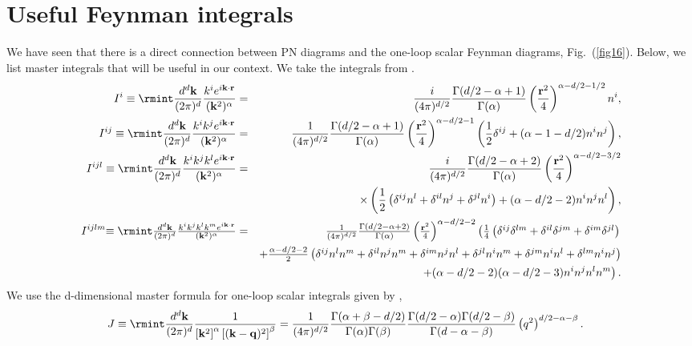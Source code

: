 \section{Useful Feynman integrals} \label{ch1:app:E}
We have seen that there is a direct connection between PN diagrams and the one-loop scalar Feynman diagrams, Fig.~(\ref{fig16}). Below, we list master integrals that will be useful in our context. We take the integrals from \cite{Levi:2011eq}.
\begingroup
\small
\begin{eqnarray}
\label{ch1:tensorfourierindentity}
I^i\equiv\rmint\frac{d^d\bf{k}}{(2\pi)^d}\frac{k^ie^{i\bf{k}\cdot\bf{r}}}{({\bf{k}}^2)^\alpha}&=&\frac{i}{(4\pi)^{d/2}}\frac{\Gamma(d/2-\alpha+1)}{\Gamma(\alpha)}\left(\frac{{\bf{r}}^2}{4}\right)^{\alpha-d/2-1/2}n^i,\\
I^{ij}\equiv\rmint\frac{d^d\bf{k}}{(2\pi)^d}\frac{k^ik^je^{i\bf{k}\cdot\bf{r}}}{({\bf{k}}^2)^\alpha}&=&\frac{1}{(4\pi)^{d/2}}\frac{\Gamma(d/2-\alpha+1)}{\Gamma(\alpha)}\left(\frac{{\bf{r}}^2}{4}\right)^{\alpha-d/2-1}\left(\frac{1}{2}\delta^{ij}+(\alpha-1-d/2)n^in^j\right),\\
I^{ijl}\equiv\rmint\frac{d^d\bf{k}}{(2\pi)^d}\frac{k^ik^jk^le^{i\bf{k}\cdot\bf{r}}}{({\bf{k}}^2)^\alpha}&=&\frac{i}{(4\pi)^{d/2}}\frac{\Gamma(d/2-\alpha+2)}{\Gamma(\alpha)}\left(\frac{{\bf{r}}^2}{4}\right)^{\alpha-d/2-3/2}\nonumber\\
&&\quad
\times\left(\frac{1}{2}\left(\delta^{ij}n^l+\delta^{il}n^j+\delta^{jl}n^i\right)+(\alpha-d/2-2)n^in^jn^l\right),\\
I^{ijlm}\textstyle{\equiv\rmint\frac{d^d\bf{k}}{(2\pi)^d}\frac{k^ik^jk^lk^me^{i\bf{k}\cdot\bf{r}}}{({\bf{k}}^2)^\alpha}}&=&\textstyle{\frac{1}{(4\pi)^{d/2}}\frac{\Gamma(d/2-\alpha+2)}{\Gamma(\alpha)}\left(\frac{{\bf{r}}^2}{4}\right)^{\alpha-d/2-2}\left(\frac{1}{4}\left(\delta^{ij}\delta^{lm}+\delta^{il}\delta^{jm}+\delta^{im}\delta^{jl}\right)\right.} \\
&&
\textstyle{+\frac{\alpha-d/2-2}{2}\left(\delta^{ij}n^ln^m+\delta^{il}n^jn^m+\delta^{im}n^jn^l+\delta^{jl}n^in^m+\delta^{jm}n^in^l+\delta^{lm}n^in^j\right) }\nonumber\\
&&\left.\quad
+(\alpha-d/2-2)(\alpha-d/2-3)n^in^jn^ln^m\right).\nonumber
\end{eqnarray}
\endgroup
We use the d-dimensional master formula for one-loop scalar integrals given by ,
\begin{align}
\begin{split}
   & J\equiv\rmint \frac{d^d\bf{k}}{(2\pi)^d}\frac{1}{\left[{\bf{k}}^2\right]^\alpha\left[({\bf{k}-\bf{q}})^2\right]^\beta}=  \frac{1}{(4\pi)^{d/2}}\frac{\Gamma(\alpha+\beta-d/2)}{\Gamma(\alpha)\Gamma(\beta)}\frac{\Gamma(d/2-\alpha)\Gamma(d/2-\beta)}{\Gamma(d-\alpha-\beta)}\left(q^2\right)^{d/2-\alpha-\beta}.\label{ch1:eq:1loop}
    \end{split}
\end{align}

